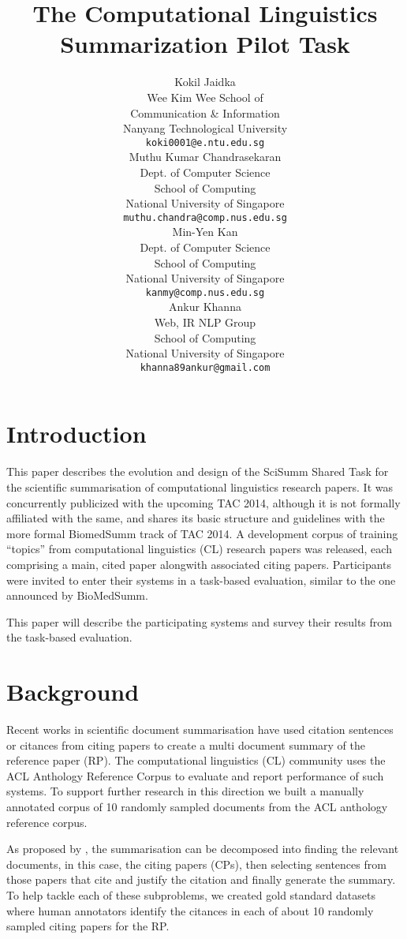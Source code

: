 \documentclass[11pt]{article}
\title{The Computational Linguistics Summarization Pilot Task}
\author{Kokil Jaidka \\
  Wee Kim Wee School of  \\
  Communication \& Information \\
 Nanyang Technological University \\
  {\tt koki0001@e.ntu.edu.sg} \\\And
  Muthu Kumar Chandrasekaran \\
  Dept. of Computer Science \\
  School of Computing \\
  National University of Singapore \\
  {\tt muthu.chandra@comp.nus.edu.sg} \\\And
  Min-Yen Kan \\
  Dept. of Computer Science \\
  School of Computing \\
  National University of Singapore \\
  {\tt kanmy@comp.nus.edu.sg} \\\And
  Ankur Khanna \\
  Web, IR \/ NLP Group \\
  School of Computing \\
  National University of Singapore \\
  {\tt khanna89ankur@gmail.com} 
  }
\date{}
\begin{document}
\maketitle
\begin{abstract}
\end{abstract}

\section{Introduction}
This paper describes the evolution and design of the SciSumm Shared Task for 
the scientific summarisation of computational linguistics research papers. 
It was concurrently publicized with the upcoming TAC 2014, although it is not 
formally affiliated with the same, and shares its basic structure and 
guidelines with the more formal BiomedSumm track of TAC 2014. A development 
corpus of training ``topics'' from computational linguistics (CL) research 
papers was released, each comprising a main, cited paper alongwith 
associated citing papers. Participants were invited to enter their systems 
in a task-based evaluation, similar to the one announced by BioMedSumm.

This paper will describe the participating systems and survey their results 
from the task-based evaluation.

\section{Background}
Recent works \cite{mohammad2009}\cite{abu2011} in scientific document 
summarisation have used citation sentences or citances from citing papers 
to create a multi document summary of the reference paper (RP). The 
computational linguistics (CL) community uses the ACL Anthology Reference 
Corpus \cite{bird2008} to evaluate and report performance of such systems. 
To support further research in this direction 
we built a manually annotated corpus of 10 randomly sampled documents from 
the ACL anthology reference corpus.

As proposed by \cite{vu2010}, \cite{hoang2010} the summarisation can be 
decomposed into finding the relevant documents, in this case, the citing 
papers (CPs), then selecting sentences from those papers that cite and 
justify the citation and finally generate the summary. To help tackle each 
of these subproblems, we created gold standard datasets where human 
annotators identify the citances in each of about 10 randomly sampled citing 
papers for the RP. 
\end{document}
